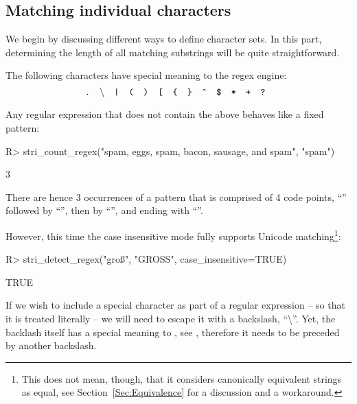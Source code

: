 \documentclass[nojss]{jss}
\begin{document}
\subsection{Matching individual characters}\label{Sec:RegexIndividualChars}

We begin by discussing different ways to define character sets.
In this part, determining the length of all matching substrings
will be quite straightforward.

The following characters have special
meaning to the regex engine:
\[
\text{
  \texttt{.}\quad
  \textbackslash{}\quad
  \texttt{|}\quad
  \texttt{(}\quad
  \texttt{)}\quad
  \texttt{[}\quad
  \texttt{\{}\quad
  \texttt{\}}\quad
  \texttt{\^{}}\quad
  \texttt{\$}\quad
  \texttt{*}\quad
  \texttt{+}\quad
  \texttt{?}\quad
}
\]

Any regular expression that does not contain the above
behaves like a fixed pattern:

\begin{Schunk}
\begin{Sinput}
R> stri_count_regex("spam, eggs, spam, bacon, sausage, and spam", "spam")
\end{Sinput}
\begin{Soutput}
[1] 3
\end{Soutput}
\end{Schunk}

There are hence 3 occurrences of a pattern that is comprised
of 4 code points, ``'' followed by ``'',
then by ``'', and ending with ``''.

However, this time the case insensitive mode fully
supports Unicode matching\footnote{%
This does not mean, though, that it considers canonically
equivalent strings as equal,
see Section~\ref{Sec:Equivalence} for a discussion and a workaround.}:

\begin{Schunk}
\begin{Sinput}
R> stri_detect_regex("groß", "GROSS", case_insensitive=TRUE)
\end{Sinput}
\begin{Soutput}
[1] TRUE
\end{Soutput}
\end{Schunk}

If we wish to include a special character as part of a regular expression --
so that it is treated literally -- we will need to escape it with  a backslash,
``\textbackslash''. Yet, the backlash itself
has a special meaning to , see ,
therefore it needs to be preceded by another backslash.
\end{document}
